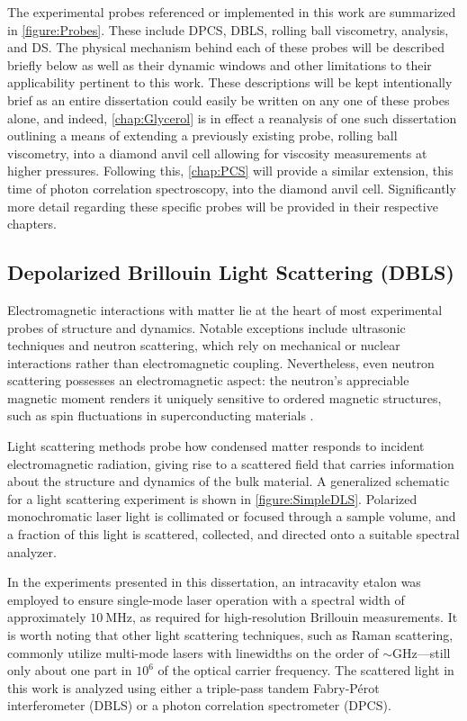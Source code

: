 The experimental probes referenced or implemented in this work are summarized in \fig \nolinebreak \ref{figure:Probes}. These include DPCS, DBLS, rolling ball viscometry, \tgp analysis, and DS. The physical mechanism behind each of these probes will be described briefly below as well as their dynamic windows and other limitations to their applicability pertinent to this work.  These descriptions will be kept intentionally brief as an entire dissertation could easily be written on any one of these probes alone, and indeed, \chap\nolinebreak \ref{chap:Glycerol} is in effect a reanalysis of one such dissertation outlining a means of extending a previously existing probe, rolling ball viscometry, into a diamond anvil cell allowing for viscosity measurements at higher pressures.\cite{CookThesis}  Following this, \chap\nolinebreak \ref{chap:PCS} will provide a similar extension, this time of photon correlation spectroscopy, into the diamond anvil cell.  Significantly more detail regarding these specific probes will be provided in their respective chapters.

\subsection{Depolarized Brillouin Light Scattering (DBLS)}
Electromagnetic interactions with matter lie at the heart of most experimental probes of structure and dynamics. Notable exceptions include ultrasonic techniques and neutron scattering, which rely on mechanical or nuclear interactions rather than electromagnetic coupling. Nevertheless, even neutron scattering possesses an electromagnetic aspect: the neutron’s appreciable magnetic moment renders it uniquely sensitive to ordered magnetic structures, such as spin fluctuations in superconducting materials \cite{Zaliznyak}. 

Light scattering methods probe how condensed matter responds to incident electromagnetic radiation, giving rise to a scattered field that carries information about the structure and dynamics of the bulk material. A generalized schematic for a light scattering experiment is shown in \fig \nolinebreak \ref{figure:SimpleDLS}. Polarized monochromatic laser light is collimated or focused through a sample volume, and a fraction of this light is scattered, collected, and directed onto a suitable spectral analyzer.

In the experiments presented in this dissertation, an intracavity etalon was employed to ensure single-mode laser operation with a spectral width of approximately $10~\si{\mega\hertz}$, as required for high-resolution Brillouin measurements. It is worth noting that other light scattering techniques, such as Raman scattering, commonly utilize multi-mode lasers with linewidths on the order of $\sim\si{\giga\hertz}$—still only about one part in $10^6$ of the optical carrier frequency. The scattered light in this work is analyzed using either a triple-pass tandem Fabry-P\'erot interferometer (DBLS) or a photon correlation spectrometer (DPCS).


